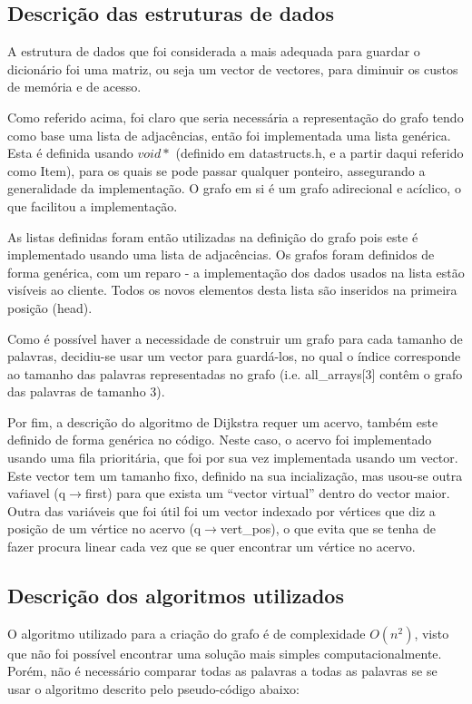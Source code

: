 \documentclass[a4paper, 11pt]{article}
\begin{document}
\subsection{Descrição das estruturas de dados}
    \par A estrutura de dados que foi considerada a mais adequada para guardar o dicionário foi uma matriz, ou seja um vector de vectores, para diminuir os custos de memória e de acesso.
    \par Como referido acima, foi claro que seria necessária a representação do grafo tendo como base uma lista de adjacências, então foi implementada uma lista genérica. Esta é definida usando $void *$ (definido em datastructs.h, e a partir daqui referido como Item), para os quais se pode passar qualquer ponteiro, assegurando a generalidade da implementação. O grafo em si é um grafo adirecional e acíclico, o que facilitou a implementação.
    \par As listas definidas foram então utilizadas na definição do grafo pois este é implementado usando uma lista de adjacências. Os grafos foram definidos de forma genérica, com um reparo - a implementação dos dados usados na lista estão visíveis ao cliente. Todos os novos elementos desta lista são inseridos na primeira posição (head).
    \par Como é possível haver a necessidade de construir um grafo para cada tamanho de palavras, decidiu-se usar um vector para guardá-los, no qual o índice corresponde ao tamanho das palavras representadas no grafo (i.e. all{\_}arrays[3] contêm o grafo das palavras de tamanho 3).
    \par Por fim, a descrição do algoritmo de Dijkstra requer um acervo, também este definido de forma genérica no código.
     Neste caso, o acervo foi implementado usando uma fila prioritária, que foi por sua vez implementada usando um vector.
      Este vector tem um tamanho fixo, definido na sua incialização, mas usou-se outra vaŕiavel (q$\rightarrow$first) para que exista um ``vector virtual''  dentro do vector maior. Outra das variáveis que foi útil foi um vector indexado por vértices que diz a posição de um vértice no acervo (q$\rightarrow$vert{\_}pos), o que evita que se tenha de fazer procura linear cada vez que se quer encontrar um vértice no acervo.
    
\subsection{Descrição dos algoritmos utilizados}
    \par O algoritmo utilizado para a criação do grafo é de complexidade $O(n^2)$, visto que não foi possível encontrar uma solução mais simples computacionalmente. Porém, não é necessário comparar todas as palavras a todas as palavras se se usar o algoritmo descrito pelo pseudo-código abaixo:
    
\end{document}
